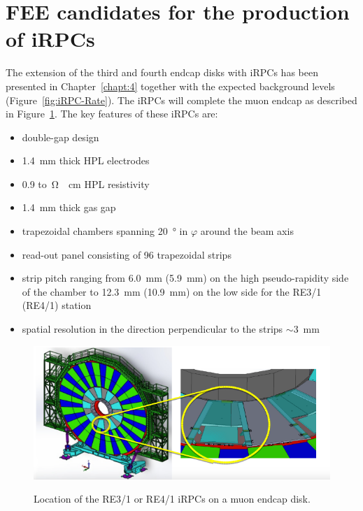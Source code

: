 \section{FEE candidates for the production of iRPCs}
\label{chapt6:sec:candidates}

	The extension of the third and fourth endcap disks with \acl{iRPC}s has been presented in Chapter~\ref{chapt:4} together with the expected background levels (Figure~\ref{fig:iRPC-Rate}). The iRPCs will complete the muon endcap as described in Figure~\ref{fig:iRPC-Wheel}. The key features of these iRPCs are:

	\begin{itemize}
		\item double-gap design
		\item \SI{1.4}{mm} thick HPL electrodes
		\item 0.9 to \,\si{\ohm\cdot cm} HPL resistivity
		\item \SI{1.4}{mm} thick gas gap
		\item trapezoidal chambers spanning \SI{20}{\degree} in $\varphi$ around the beam axis
		\item read-out panel consisting of 96 trapezoidal strips
		\item strip pitch ranging from \SI{6.0}{mm} (\SI{5.9}{mm}) on the high pseudo-rapidity side of the chamber to \SI{12.3}{mm} (\SI{10.9}{mm}) on the low side for the RE3/1 (RE4/1) station
		\item spatial resolution in the direction perpendicular to the strips $\sim$\SI{3}{mm}
	\end{itemize}
	
	\begin{figure}[H]
		\centering
		\includegraphics[width = \linewidth]{fig/chapt6/iRPC-Wheel.png}\\
		\caption{\label{fig:iRPC-Wheel} Location of the RE3/1 or RE4/1 iRPCs on a muon endcap disk.}
	\end{figure}

